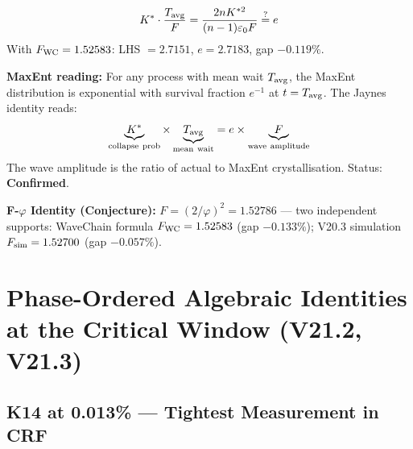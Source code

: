 \documentclass[12pt, a4paper]{article}
\begin{document}
\begin{keybox}[title={Jaynes Identity Confirmed: $K^*\cdot T_{\rm avg}/F = e$ (gap $0.06\%$--$0.119\%$)}]
\[
  K^*\cdot\frac{T_{\rm avg}}{F} = \frac{2nK^{*2}}{(n-1)\varepsilon_0 F}
  \stackrel{?}{=} e
\]
With $F_{\rm WC} = 1.52583$: LHS $= 2.7151$, $e = 2.7183$, gap $-0.119\%$.

\textbf{MaxEnt reading:} For any process with mean wait $T_{\rm avg}$, the MaxEnt distribution is exponential with survival fraction $e^{-1}$ at $t = T_{\rm avg}$. The Jaynes identity reads:
\[
  \underbrace{K^*}_{\rm collapse\ prob} \times \underbrace{T_{\rm avg}}_{\rm mean\ wait} = e \times \underbrace{F}_{\rm wave\ amplitude}
\]
The wave amplitude is the ratio of actual to MaxEnt crystallisation. Status: \textbf{Confirmed}.

\textbf{F-$\varphi$ Identity (Conjecture):} $F = (2/\varphi)^2 = 1.52786$ --- two independent supports:
WaveChain formula $F_{\rm WC} = 1.52583$ (gap $-0.133\%$); V20.3 simulation $F_{\rm sim} = 1.52700$ (gap $-0.057\%$).
\end{keybox}

\section{Phase-Ordered Algebraic Identities at the Critical Window (V21.2, V21.3)}

\subsection{K14 at 0.013\% --- Tightest Measurement in CRF}
\end{document}
